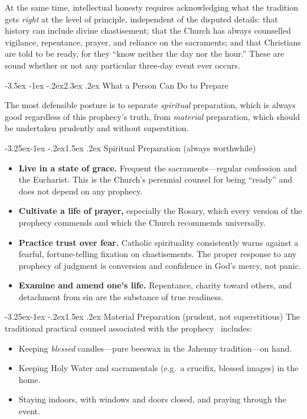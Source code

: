 \documentclass[11pt]{article}
\makeatletter
\renewcommand\section{\@startsection{section}{1}{\z@}%
  {-3.5ex \@plus -1ex \@minus -.2ex}{2.3ex \@plus.2ex}%
  {\normalfont\Large\bfseries\color{accent}}}
\renewcommand\subsection{\@startsection{subsection}{2}{\z@}%
  {-3.25ex\@plus -1ex \@minus -.2ex}{1.5ex \@plus .2ex}%
  {\normalfont\large\bfseries\color{accent}}}
\makeatother
\begin{document}
At the same time, intellectual honesty requires acknowledging what the
tradition gets \emph{right} at the level of principle, independent of the
disputed details: that history can include divine chastisement; that the
Church has always counselled vigilance, repentance, prayer, and reliance on
the sacraments; and that Christians are told to be ready, for they ``know
neither the day nor the hour.'' These are sound whether or not any particular
three-day event ever occurs.

\section{What a Person Can Do to Prepare}

The most defensible posture is to separate \emph{spiritual} preparation, which
is always good regardless of this prophecy's truth, from \emph{material}
preparation, which should be undertaken prudently and without superstition.

\subsection{Spiritual Preparation (always worthwhile)}
\begin{itemize}
  \item \textbf{Live in a state of grace.} Frequent the sacraments---regular
        confession and the Eucharist. This is the Church's perennial counsel
        for being ``ready'' and does not depend on any prophecy.
  \item \textbf{Cultivate a life of prayer,} especially the Rosary, which
        every version of the prophecy commends and which the Church recommends
        universally.
  \item \textbf{Practice trust over fear.} Catholic spirituality consistently
        warns against a fearful, fortune-telling fixation on chastisements.
        The proper response to any prophecy of judgment is conversion and
        confidence in God's mercy, not panic.
  \item \textbf{Examine and amend one's life.} Repentance, charity toward
        others, and detachment from sin are the substance of true readiness.
\end{itemize}

\subsection{Material Preparation (prudent, not superstitious)}
The traditional practical counsel associated with the prophecy~\cite{jahenny,catholicsupply} includes:
\begin{itemize}
  \item Keeping \emph{blessed} candles---pure beeswax in the Jahenny
        tradition---on hand.
  \item Keeping Holy Water and sacramentals (e.g.\ a crucifix, blessed images)
        in the home.
  \item Staying indoors, with windows and doors closed, and praying through
        the event.
\end{itemize}
\end{document}
